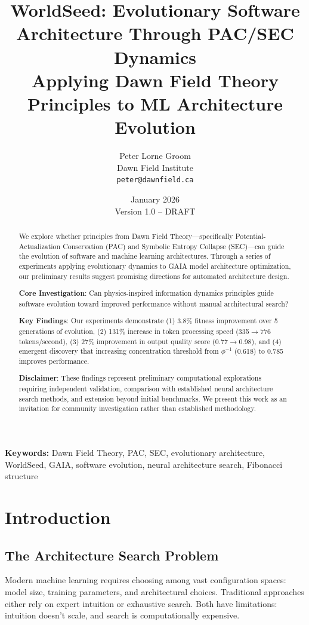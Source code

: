 \documentclass[11pt,a4paper]{article}
\title{\textbf{WorldSeed: Evolutionary Software Architecture Through PAC/SEC Dynamics}\\
\large{Applying Dawn Field Theory Principles to ML Architecture Evolution}}
\author{Peter Lorne Groom\\
Dawn Field Institute\\
\texttt{peter@dawnfield.ca}}
\date{January 2026\\Version 1.0 -- DRAFT}
\begin{document}
\maketitle

\begin{abstract}
We explore whether principles from Dawn Field Theory---specifically Potential-Actualization Conservation (PAC) and Symbolic Entropy Collapse (SEC)---can guide the evolution of software and machine learning architectures. Through a series of experiments applying evolutionary dynamics to GAIA model architecture optimization, our preliminary results suggest promising directions for automated architecture design.

\textbf{Core Investigation}: Can physics-inspired information dynamics principles guide software evolution toward improved performance without manual architectural search?

\textbf{Key Findings}: Our experiments demonstrate (1) 3.8\% fitness improvement over 5 generations of evolution, (2) 131\% increase in token processing speed (335$\to$776 tokens/second), (3) 27\% improvement in output quality score (0.77$\to$0.98), and (4) emergent discovery that increasing concentration threshold from $\phi^{-1}$ (0.618) to 0.785 improves performance.

\textbf{Disclaimer}: These findings represent preliminary computational explorations requiring independent validation, comparison with established neural architecture search methods, and extension beyond initial benchmarks. We present this work as an invitation for community investigation rather than established methodology.
\end{abstract}

\textbf{Keywords:} Dawn Field Theory, PAC, SEC, evolutionary architecture, WorldSeed, GAIA, software evolution, neural architecture search, Fibonacci structure

\section{Introduction}

\subsection{The Architecture Search Problem}

Modern machine learning requires choosing among vast configuration spaces: model size, training parameters, and architectural choices. Traditional approaches either rely on expert intuition or exhaustive search. Both have limitations: intuition doesn't scale, and search is computationally expensive.
\end{document}
